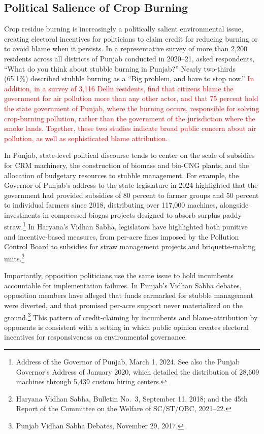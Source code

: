 \documentclass[12pt]{article}
\begin{document}
\subsection{Political Salience of Crop Burning}\label{ssec:salience}
Crop residue burning is increasingly a politically salient environmental issue, creating electoral incentives for politicians to claim credit for reducing burning or to avoid blame when it persists. In a representative survey of more than 2,200 residents across all districts of Punjab conducted in 2020–21, \citet{yang2025perceptions} asked respondents, ``What do you think about stubble burning in Punjab?'' Nearly two-thirds (65.1\%) described stubble burning as a ``Big problem, and have to stop now.'' \textcolor{red}{In addition, in a survey of 3,116 Delhi residents, \citep{singh_thachil_2023_airpollution} find that citizens blame the government for air pollution more than any other actor, 
and that 75 percent hold the state government of Punjab, where the burning occurs, responsible for solving crop-burning pollution, rather than the government of the jurisdiction where the smoke lands. Together, these two studies indicate broad public concern about air pollution, as well as sophisticated blame attribution.}

In Punjab, state-level political discourse tends to center on the scale of subsidies for CRM machinery, the construction of biomass and bio-CNG plants, and the allocation of budgetary resources to stubble management. For example, the Governor of Punjab's address to the state legislature in 2024 highlighted that the government had provided subsidies of 80 percent to farmer groups and 50 percent to individual farmers since 2018, distributing over 117,000 machines, alongside investments in compressed biogas projects designed to absorb surplus paddy straw.\footnote{Address of the Governor of Punjab, March 1, 2024. See also the Punjab Governor's Address of January 2020, which detailed the distribution of 28,609 machines through 5,439 custom hiring centers.} In Haryana's Vidhan Sabha, legislators have highlighted both punitive and incentive-based measures, from per-acre fines imposed by the Pollution Control Board to subsidies for straw management projects and briquette-making units.\footnote{Haryana Vidhan Sabha, Bulletin No.\ 3, September 11, 2018; and the 45th Report of the Committee on the Welfare of SC/ST/OBC, 2021--22.}
 
Importantly, opposition politicians use the same issue to hold incumbents accountable for implementation failures. In Punjab's Vidhan Sabha debates, opposition members have alleged that funds earmarked for stubble management were diverted, and that promised per-acre support never materialized on the ground.\footnote{Punjab Vidhan Sabha Debates, November 29, 2017.} This pattern of credit-claiming by incumbents and blame-attribution by opponents is consistent with a setting in which public opinion creates electoral incentives for responsiveness on environmental governance. 
\end{document}
